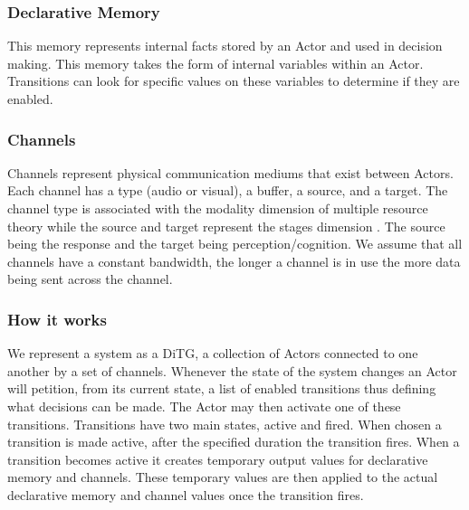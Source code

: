 \subsubsection{Declarative Memory }
This memory represents internal facts stored by an Actor and used in decision
making.  This memory takes the form of internal variables within an Actor. 
Transitions can look for specific values on these variables to determine if they are enabled.

\subsubsection{Channels} 
Channels represent physical communication mediums that exist between Actors. 
Each channel has a type (audio or visual), a buffer, a source, and a target. 
The channel type is associated with the modality dimension of multiple resource
theory while the source and target represent the stages
dimension \cite{wickens2002multiple}.  The source being the response and the
target being perception/cognition.  We assume that all channels have a constant
bandwidth, the longer a channel is in use the more data being sent across the channel.  

\subsubsection{How it works}
We represent a system as a DiTG, a collection of
Actors connected to one another by a set of channels.  Whenever the state of the
system changes an Actor will petition, from its current state, a list of enabled
transitions thus defining what decisions can be made.  The Actor may then
activate one of these transitions.  Transitions have two main states, active and
fired.  When chosen a transition is made active, after the specified duration
the transition fires.  When a transition becomes active it creates temporary
output values for declarative memory and channels.  These temporary values are
then applied to the actual declarative memory and channel values once the transition fires.

